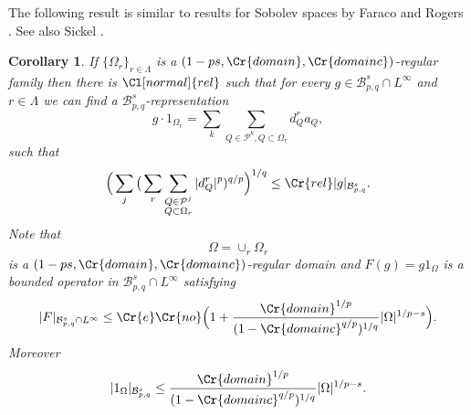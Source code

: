 \documentclass{amsart}
\newtheorem{corollary}[theorem]{Corollary}
\theoremstyle{definition}
\newcommand{\Cll}[2][normal]{\Cl[#1]{#2}}
\newcommand{\Crr}[1]{\Cr{#1}}
\begin{document}
The following result is similar to results for Sobolev spaces  by Faraco and Rogers \cite{faraco}. See also Sickel \cite{sickel}.

\begin{corollary} If $\{ \Omega_r\}_{r\in \Lambda}$ is a $(1-ps, \Crr{domain},\Crr{domainc})$-regular family  then there is $\Cll{rel}$ such that  for every  $g\in \mathcal{B}^{s}_{p,q}\cap L^\infty$ and $r\in\Lambda$ we can find a  $\mathcal{B}^{s}_{p,q}$-representation
\begin{equation}\label{pdd} g\cdot 1_{\Omega_r}= \sum_k \sum_{Q\in \mathcal{P}^k, Q \subset \Omega_r }  d_Q^r   a_Q,\end{equation}
such that 
\begin{equation}\label{hiip1}  \Big( \sum_j \big(  \sum_r    \sum_{\substack{ Q\in \mathcal{P}^j \\  Q \subset \Omega_r }}  |d_Q^r|^p )^{q/p}  \Big)^{1/q} \leq \Crr{rel}  |g|_{\mathcal{B}^{s}_{p,q}}.\end{equation}
Note that 
$$\Omega=\cup_r\Omega_r$$
is  a $(1-ps, \Crr{domain},\Crr{domainc})$-regular domain and 
 $F(g)=g1_{\Omega}$ is a bounded operator in $\mathcal{B}^{s}_{p,q}\cap L^\infty$ satisfying 
\begin{equation}\label{G} |F|_{\mathcal{B}^{s}_{p,q}\cap L^\infty}\leq  \Crr{e}\Crr{no} \Big( 1+  \frac{\Crr{domain}^{1/p}}{(1-\Crr{domainc}^{q/p})^{1/q}} |\Omega|^{1/p-s}\Big).\end{equation}
Moreover
\begin{equation}\label{estG} |1_\Omega|_{\mathcal{B}^s_{p,q}}\leq  \frac{\Crr{domain}^{1/p}}{(1-\Crr{domainc}^{q/p})^{1/q}} |\Omega|^{1/p-s}.\end{equation}
\end{corollary} 
\end{document}
